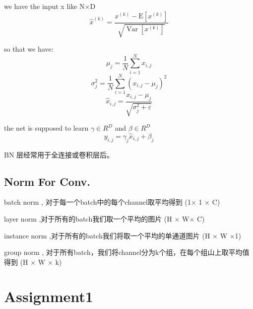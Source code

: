 \documentclass[a4paper]{article}
\begin{document}
we have the input  x like N$\times$D 
$$
\widehat{x}^{(k)}=\frac{x^{(k)}-\mathrm{E}\left[x^{(k)}\right]}{\sqrt{\operatorname{Var}\left[x^{(k)}\right]}}
$$

so that we have:
$$
\mu_{j}=\frac{1}{N} \sum_{i=1}^{N} x_{i, j}
$$
$$
\sigma_{j}^{2}=\frac{1}{N} \sum_{i=1}^{N}\left(x_{i, j}-\mu_{j}\right)^{2}
$$
$$
\hat{x}_{i, j}=\frac{x_{i, j}-\mu_{j}}{\sqrt{\sigma_{j}^{2}+\varepsilon}}
$$


the net is supposed to learn $\gamma \in R^D$  and  $\beta\in R^D$ 
$$
y_{i, j}=\gamma_{j} \hat{x}_{i, j}+\beta_{j}
$$

BN 层经常用于全连接或卷积层后。

\subsection{Norm For Conv.}

batch norm , 对于每一个batch中的每个channel取平均得到 (1× 1 × C)

layer norm ,对于所有的batch我们取一个平均的图片 (H × W× C)

instance norm ,对于所有的batch我们将取一个平均的单通道图片 (H × W ×1)

group norm , 对于所有batch，我们将channel分为k个组，在每个组山上取平均值得到  (H × W × k)

\section{Assignment1}
\end{document}
